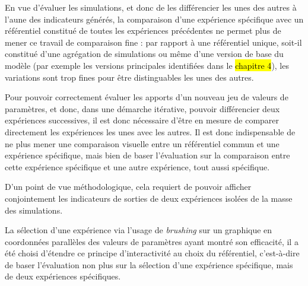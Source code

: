 	En vue d'évaluer les simulations, et donc de les différencier les unes des autres à l'aune des indicateurs générés, la comparaison d'une expérience spécifique avec un référentiel constitué de toutes les expériences précédentes ne permet plus de mener ce travail de comparaison fine : par rapport à une référentiel unique, soit-il constitué d'une agrégation de simulations ou même d'une version \og de base\fg{} du modèle (par exemple les versions principales identifiées dans le \hl{chapitre 4}), les variations sont trop fines pour être distinguables les unes des autres.

	Pour pouvoir correctement évaluer les apports d'un nouveau jeu de valeurs de paramètres, et donc, dans une démarche itérative, pouvoir différencier deux expériences successives, il est donc nécessaire d'être en mesure de comparer directement les expériences les unes avec les autres.
	Il est donc indispensable de ne plus mener une comparaison visuelle entre un référentiel commun et une expérience spécifique, mais bien de baser l'évaluation sur la comparaison entre cette expérience spécifique et une autre expérience, tout aussi spécifique.

	D'un point de vue méthodologique, cela requiert de pouvoir afficher conjointement les indicateurs de sorties de deux expériences isolées de la masse des simulations.

	La sélection d'une expérience via l'usage de \textit{brushing} sur un graphique en coordonnées parallèles des valeurs de paramètres ayant montré son efficacité, il a été choisi d'étendre ce principe d'interactivité au choix du référentiel, c'est-à-dire de baser l'évaluation non plus sur la sélection d'une expérience spécifique, mais de deux expériences spécifiques.

